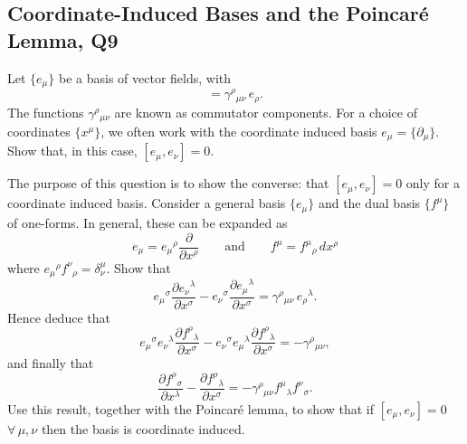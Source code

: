 \subsection{Coordinate-Induced Bases and the Poincaré Lemma, Q9}

Let $\{e_\mu\}$ be a basis of vector fields, with
\begin{equation}
    [e_\mu, e_\nu] = \gamma^\rho{}_{\mu\nu}\,e_\rho.
\end{equation}
The functions $\gamma^\rho{}_{\mu\nu}$ are known as commutator components. For a choice of coordinates $\{x^\mu\}$, we often work with the coordinate induced basis $e_\mu = \{\partial_\mu\}$. Show that, in this case, $[e_\mu, e_\nu] = 0$.

The purpose of this question is to show the converse: that $[e_\mu,e_\nu]=0$ only for a coordinate induced basis. Consider a general basis $\{e_\mu\}$ and the dual basis $\{f^\mu\}$ of one-forms. In general, these can be expanded as
\begin{equation}
    e_\mu = e_\mu{}^\rho\frac{\partial}{\partial x^\rho} \qquad \text{and} \qquad f^\mu = f^\mu{}_\rho\,dx^\rho
\end{equation}
where $e_\mu{}^\rho f^\nu{}_\rho = \delta^\mu_\nu$. Show that
\begin{equation}
    e_\mu{}^\sigma\frac{\partial e_\nu{}^\lambda}{\partial x^\sigma} - e_\nu{}^\sigma\frac{\partial e_\mu{}^\lambda}{\partial x^\sigma} = \gamma^\rho{}_{\mu\nu}\,e_\rho{}^\lambda.
\end{equation}
Hence deduce that
\begin{equation}
    e_\mu{}^\sigma e_\nu{}^\lambda\frac{\partial f^\rho{}_\lambda}{\partial x^\sigma} - e_\nu{}^\sigma e_\mu{}^\lambda\frac{\partial f^\rho{}_\lambda}{\partial x^\sigma} = -\gamma^\rho{}_{\mu\nu},
\end{equation}
and finally that
\begin{equation}
    \frac{\partial f^\rho{}_\sigma}{\partial x^\lambda} - \frac{\partial f^\rho{}_\lambda}{\partial x^\sigma} = -\gamma^\rho{}_{\mu\nu}f^\mu{}_\lambda f^\nu{}_\sigma.
\end{equation}
Use this result, together with the Poincar\'e lemma, to show that if $[e_\mu,e_\nu]=0$ $\forall\,\mu,\nu$ then the basis is coordinate induced.
